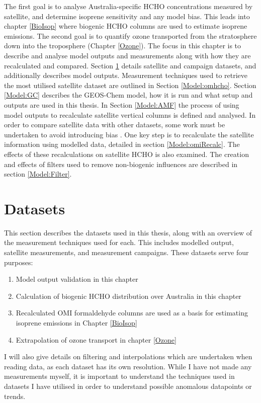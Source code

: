   The first goal is to analyse Australia-specific HCHO concentrations measured by satellite, and determine isoprene sensitivity and any model bias.
  This leads into chapter \ref{BioIsop} where biogenic HCHO columns are used to estimate isoprene emissions.
  The second goal is to quantify ozone transported from the stratosphere down into the troposphere (Chapter \ref{Ozone}).
  The focus in this chapter is to describe and analyse model outputs and measurements along with how they are recalculated and compared.
  Section \ref{Model:Datasets} details satellite and campaign datasets, and additionally describes model outputs.
  Measurement techniques used to retrieve the most utilised satellite dataset are outlined in Section \ref{Model:omhcho}.
  Section \ref{Model:GC} describes the GEOS-Chem model, how it is run and what setup and outputs are used in this thesis.
  In Section \ref{Model:AMF} the process of using model outputs to recalculate satellite vertical columns is defined and analysed.
  In order to compare satellite data with other datasets, some work must be undertaken to avoid introducing bias \parencite[e.g.,][]{Palmer2001, Eskes2003, Marais2012, Lamsal2014}.
  One key step is to recalculate the satellite information using modelled data, detailed in section \ref{Model:omiRecalc}.
  The effects of these recalculations on satellite HCHO is also examined.
  The creation and effects of filters used to remove non-biogenic influences are described in section \ref{Model:Filter}.
  
  

\section{Datasets}
  \label{Model:Datasets}
  
  This section describes the datasets used in this thesis, along with an overview of the measurement techniques used for each.
  This includes modelled output, satellite measurements, and measurement campaigns.
  These datasets serve four purposes: 
  \begin{enumerate}
    \item Model output validation in this chapter
    \item Calculation of biogenic HCHO distribution over Australia in this chapter
    \item Recalculated OMI formaldehyde columns are used as a basis for estimating isoprene emissions in Chapter \ref{BioIsop}
    \item Extrapolation of ozone transport in chapter \ref{Ozone}
  \end{enumerate}
  I will also give details on filtering and interpolations which are undertaken when reading data, as each dataset has its own resolution.
  While I have not made any measurements myself, it is important to understand the techniques used in datasets I have utilised in order to understand possible anomalous datapoints or trends.
  
